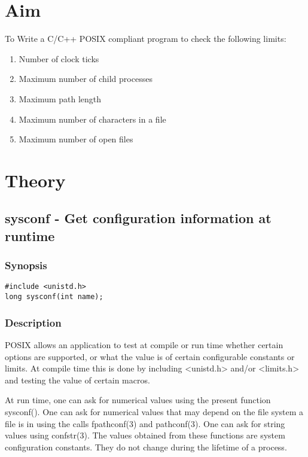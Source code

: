 \section{Aim}

To Write a C/C++ POSIX compliant program to check the following limits:
\begin{enumerate}
	\item Number of clock ticks
	\item Maximum number of child processes
	\item Maximum path length
	\item Maximum number of characters in a file
	\item Maximum number of open files
\end{enumerate}

\section{Theory}

\subsection{sysconf - Get configuration information at runtime}

\subsubsection{Synopsis}

\begin{lstlisting}
#include <unistd.h>
long sysconf(int name);
\end{lstlisting}

\subsubsection{Description}

POSIX allows an application to test at compile or run time whether certain options are supported, or what the value is of certain configurable constants or limits. At compile time this is done by including <unistd.h> and/or <limits.h> and testing the value of certain macros.

At run time, one can ask for numerical values using the present function sysconf(). One can ask for numerical values that may depend on the file system a file is in using the calls fpathconf(3) and pathconf(3). One can ask for string values using confstr(3). The values obtained from these functions are system configuration constants. They do not change during the lifetime of a process.


